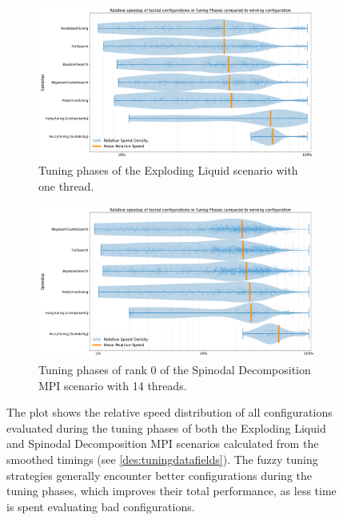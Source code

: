 \begin{figure}[H]
    \centering
    \begin{subfigure}[c]{\textwidth}
        \includegraphics[width=\columnwidth,trim={1cm 0 0cm 1cm},clip]{figures/Benchmark/Observations/tuning_phase_speedup_explodingLiquid_1_zoomed.png}
        \caption{Tuning phases of the Exploding Liquid scenario with one thread.}
        \label{fig:explodingLiquidSpeedupDensity}
    \end{subfigure}
    \begin{subfigure}[c]{\textwidth}
        \includegraphics[width=\columnwidth,trim={1cm 0 0cm 1cm},clip]{figures/Benchmark/Observations/tuning_phase_speedup_SpinodalDecompositionMPI_14_0.png}
        \caption{Tuning phases of rank 0 of the Spinodal Decomposition MPI scenario with 14 threads.}
        \label{fig:spinodalSpeedupDensity}
    \end{subfigure}
    \caption[
        Relative speed distribution of configurations evaluated during tuning phases
    ]{The plot shows the relative speed distribution of all configurations evaluated during the tuning phases of both the Exploding Liquid and Spinodal Decomposition MPI scenarios calculated from the smoothed timings (see \autoref{des:tuningdatafields}). The fuzzy tuning strategies generally encounter better configurations during the tuning phases, which improves their total performance, as less time is spent evaluating bad configurations.}
    \label{fig:tuningPhaseSpeedup}
\end{figure}

